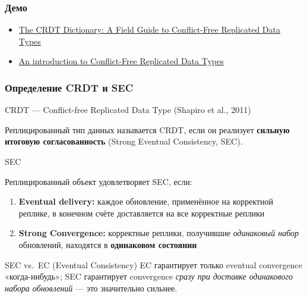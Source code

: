 \documentclass{beamer}
\newenvironment{definitionbox}[1][Определение]{%
  \begin{exampleblock}{#1}
}{%
  \end{exampleblock}
}
\begin{document}
\begin{frame}
\frametitle{Демо}
\begin{itemize}
    \item \href{https://www.iankduncan.com/engineering/2025-11-27-crdt-dictionary/}{The CRDT Dictionary: A Field Guide to Conflict-Free Replicated Data Types}
    \item \href{https://lars.hupel.info/topics/crdt/01-intro/}{An introduction to Conflict-Free Replicated Data Types}
\end{itemize}

\end{frame}

\begin{frame}
\frametitle{Определение CRDT и SEC}

\begin{definitionbox}[CRDT — Conflict-free Replicated Data Type (Shapiro et al., 2011)]
    \small
Реплицированный тип данных называется CRDT, если он реализует \textbf{сильную итоговую согласованность} (Strong Eventual Consistency, SEC).
\end{definitionbox}

\medskip
\begin{definitionbox}[SEC]
Реплицированный объект удовлетворяет SEC, если: \small
\begin{enumerate}
  \item \textbf{Eventual delivery:} каждое обновление, применённое на корректной реплике, в конечном счёте доставляется на все корректные реплики
  \item \textbf{Strong Convergence:} корректные реплики, получившие \emph{одинаковый набор} обновлений, находятся в \textbf{одинаковом состоянии}
\end{enumerate}
\end{definitionbox}

\medskip
\begin{alertblock}{SEC vs.\ EC (Eventual Consistency)}
    \small
EC гарантирует только eventual convergence «когда-нибудь»; SEC гарантирует convergence \emph{сразу при доставке одинакового набора обновлений} — это значительно сильнее.
\end{alertblock}

\end{frame}
\end{document}
